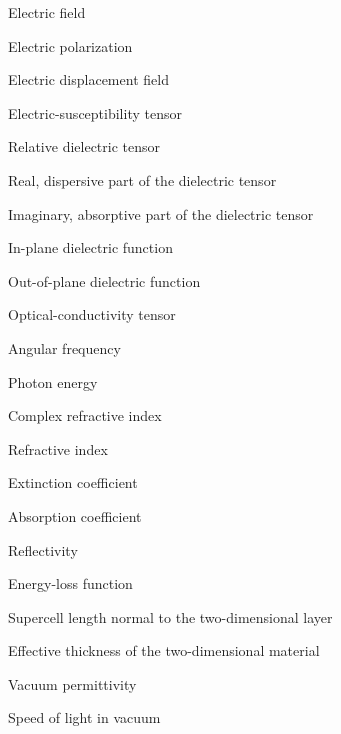 \begin{thesisfrontmatterentries}
  \item[\(\vec{E}\)] Electric field
  \item[\(\vec{P}\)] Electric polarization
  \item[\(\vec{D}\)] Electric displacement field
  \item[\(\chi_{\alpha\beta}(\omega)\)] Electric-susceptibility tensor
  \item[\(\varepsilon_{\alpha\beta}(\omega)\)] Relative dielectric tensor
  \item[\(\varepsilon_{1,\alpha\beta}(\omega)\)] Real, dispersive part of the dielectric tensor
  \item[\(\varepsilon_{2,\alpha\beta}(\omega)\)] Imaginary, absorptive part of the dielectric tensor
  \item[\(\varepsilon_{\varparallel}(\omega)\)] In-plane dielectric function
  \item[\(\varepsilon_{\perp}(\omega)\)] Out-of-plane dielectric function
  \item[\(\sigma_{\alpha\beta}(\omega)\)] Optical-conductivity tensor
  \item[\(\omega\)] Angular frequency
  \item[\(\hbar\omega\)] Photon energy
  \item[\(N_{\lambda}(\omega)\)] Complex refractive index
  \item[\(n_{\lambda}(\omega)\)] Refractive index
  \item[\(k_{\lambda}(\omega)\)] Extinction coefficient
  \item[\(\alpha_{\lambda}(\omega)\)] Absorption coefficient
  \item[\(R_{\lambda}(\omega)\)] Reflectivity
  \item[\(L_{\lambda}(\omega)\)] Energy-loss function
  \item[\(d_{\mathrm{SC}}\)] Supercell length normal to the two-dimensional layer
  \item[\(d_{\mathrm{2D}}\)] Effective thickness of the two-dimensional material
  \item[\(\varepsilon_0\)] Vacuum permittivity
  \item[\(c\)] Speed of light in vacuum
\end{thesisfrontmatterentries}


